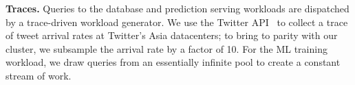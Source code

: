 


\textbf{Traces.} Queries to the database and prediction serving workloads
 are dispatched by a trace-driven workload generator.
We
use the Twitter API~\cite{twitter2020} to collect a trace of tweet arrival rates at Twitter's Asia datacenters;
to bring to parity with our cluster, we subsample the arrival rate by a factor
of 10. %
For the ML training workload, we draw queries from an essentially infinite pool to create a constant
stream of work.





